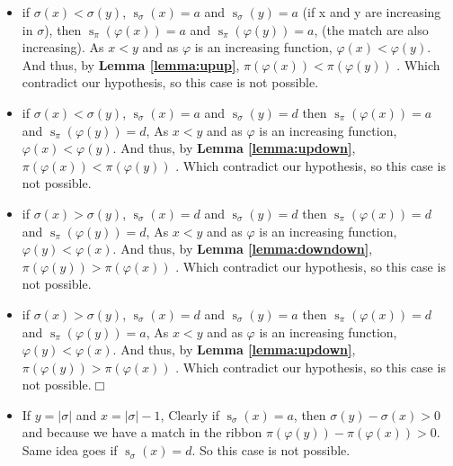 \documentclass[a4paper]{llncs}
\newcommand{\ptext}{\pi}
\newcommand{\pmotif}{\sigma}
\DeclareMathOperator{\stripea}{s}
\newcommand{\stripe}[2]{\stripea_{{#1}}({#2})}
\newcommand{\dstep}{d}
\newcommand{\ustep}{a}
\begin{document}
		\begin{itemize}		
			\item if $\pmotif(x)<\pmotif(y)$, 
			$\stripe{\pmotif}{x}=\ustep$ 
			and $\stripe{\pmotif}{y}=\ustep$
			(if x and y are increasing in $\pmotif$),
			then $\stripe{\ptext}{\varphi(x)} =\ustep$ and $\stripe{\ptext}{\varphi(y)}=\ustep$,
			(the match are also increasing).
			As $x<y$ and as $\varphi$ is an increasing function, 
			$\varphi(x) < \varphi(y)$.
			And thus, by \textbf{Lemma \ref{lemma:upup}},
			$\ptext(\varphi(x)) < \ptext(\varphi(y))$ .
			Which contradict our hypothesis,
			so this case is not possible.
		
			\item if $\pmotif(x)<\pmotif(y)$, 
			$\stripe{\pmotif}{x}=\ustep$ 
			and $\stripe{\pmotif}{y}=\dstep$
			then $\stripe{\ptext}{\varphi(x)}=\ustep$ and $\stripe{\ptext}{\varphi(y)}=\dstep$,
			As $x<y$ and as $\varphi$ is an increasing function, 
			$\varphi(x) < \varphi(y)$.
			And thus, by \textbf{Lemma \ref{lemma:updown}},
			$\ptext(\varphi(x)) < \ptext(\varphi(y))$ .
			Which contradict our hypothesis,
			so this case is not possible.			

			\item if $\pmotif(x)>\pmotif(y)$, 
			$\stripe{\pmotif}{x}=\dstep$ 
			and $\stripe{\pmotif}{y}=\dstep$
			then $\stripe{\ptext}{\varphi(x)}=\dstep$ and $\stripe{\ptext}{\varphi(y)}=\dstep$,
			As $x<y$ and as $\varphi$ is an increasing function, 
			$\varphi(y) < \varphi(x)$.
			And thus, by \textbf{Lemma \ref{lemma:downdown}},
			$\ptext(\varphi(y)) > \ptext(\varphi(x))$ .
			Which contradict our hypothesis,
			so this case is not possible.
			
			\item if $\pmotif(x)>\pmotif(y)$, 
			$\stripe{\pmotif}{x}=\dstep$ 
			and $\stripe{\pmotif}{y}=\ustep$
			then $\stripe{\ptext}{\varphi(x)}=\dstep$ and $\stripe{\ptext}{\varphi(y)}=\ustep$,
			As $x<y$ and as $\varphi$ is an increasing function, 
			$\varphi(y) < \varphi(x)$.
			And thus, by \textbf{Lemma \ref{lemma:updown}},
			$\ptext(\varphi(y)) > \ptext(\varphi(x))$ .
			Which contradict our hypothesis,
			so this case is not possible.$\Box$
			
			\item If $y = |\pmotif|$ and $x=|\pmotif|-1$,
			Clearly if $\stripe{\pmotif}{x}=\ustep$,
			then $\pmotif(y)-\pmotif(x)>0$ 
			and because we have a match in the ribbon
			$\ptext(\varphi(y))-\ptext(\varphi(x))>0$.
			Same idea goes if $\stripe{\pmotif}{x}=\dstep$.
			So this case is not possible.
			

\end{itemize}
\end{document}
